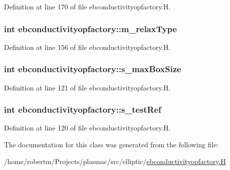 Definition at line 170 of file ebconductivityopfactory.\+H.

\subsubsection[{\texorpdfstring{m\+\_\+relax\+Type}{m_relaxType}}]{\setlength{\rightskip}{0pt plus 5cm}int ebconductivityopfactory\+::m\+\_\+relax\+Type\hspace{0.3cm}{\ttfamily [protected]}}\hypertarget{classebconductivityopfactory_af8fcc1b1b9ef706bcfd3d37f0d0a7258}{}\label{classebconductivityopfactory_af8fcc1b1b9ef706bcfd3d37f0d0a7258}


Definition at line 156 of file ebconductivityopfactory.\+H.

\subsubsection[{\texorpdfstring{s\+\_\+max\+Box\+Size}{s_maxBoxSize}}]{\setlength{\rightskip}{0pt plus 5cm}int ebconductivityopfactory\+::s\+\_\+max\+Box\+Size\hspace{0.3cm}{\ttfamily [static]}}\hypertarget{classebconductivityopfactory_ae6d0a228afd27b407c42efa67044dd6b}{}\label{classebconductivityopfactory_ae6d0a228afd27b407c42efa67044dd6b}


Definition at line 121 of file ebconductivityopfactory.\+H.

\subsubsection[{\texorpdfstring{s\+\_\+test\+Ref}{s_testRef}}]{\setlength{\rightskip}{0pt plus 5cm}int ebconductivityopfactory\+::s\+\_\+test\+Ref\hspace{0.3cm}{\ttfamily [static]}}\hypertarget{classebconductivityopfactory_a2134292a04afa30addd39cc3d6de32dd}{}\label{classebconductivityopfactory_a2134292a04afa30addd39cc3d6de32dd}


Definition at line 120 of file ebconductivityopfactory.\+H.



The documentation for this class was generated from the following file\+:\begin{DoxyCompactItemize}
\item 
/home/robertm/\+Projects/plasmac/src/elliptic/\hyperlink{ebconductivityopfactory_8H}{ebconductivityopfactory.\+H}\end{DoxyCompactItemize}
